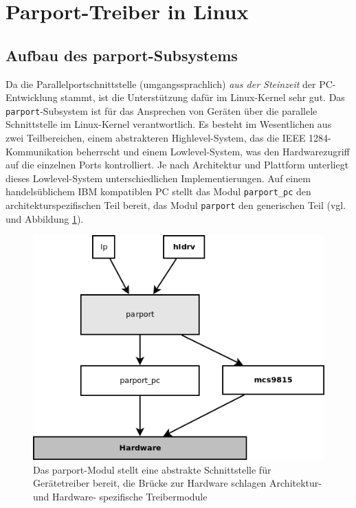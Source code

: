 \documentclass[a4paper,11pt]{article}
\begin{document}
\section{Parport-Treiber in Linux}

\subsection{Aufbau des parport-Subsystems}


Da die Parallelportschnittstelle (umgangssprachlich) \textit{aus der Steinzeit} der PC-Entwicklung stammt, ist die Unterstützung
dafür im Linux-Kernel sehr gut. Das \verb|parport|-Subsystem ist für das Ansprechen von Geräten über die parallele Schnittstelle im Linux-Kernel verantwortlich.
Es besteht im Wesentlichen aus zwei Teilbereichen, einem abstrakteren Highlevel-System, das
die IEEE 1284-Kommunikation beherrscht und einem Lowlevel-System, was den Hardwarezugriff auf die einzelnen Ports
kontrolliert. Je nach Architektur und Plattform unterliegt dieses Lowlevel-System unterschiedlichen Implementierungen. Auf einem handelsüblichem IBM kompatiblen PC stellt das Modul \verb|parport_pc| den architekturspezifischen Teil bereit, das Modul \verb|parport| den generischen Teil (vgl. \cite{net:1} und Abbildung \ref{fig:parport_struktur}). 

\begin{figure}[h!]
 \centering
 \includegraphics[scale=0.7,bb=0 0 493 380]{./pics/parport_struktur.png}
 \caption{Das parport-Modul stellt eine abstrakte Schnittstelle für Gerätetreiber bereit, die Brücke zur Hardware schlagen Architektur- und Hardware-
spezifische Treibermodule}
\label{fig:parport_struktur}
\end{figure}
\end{document}
